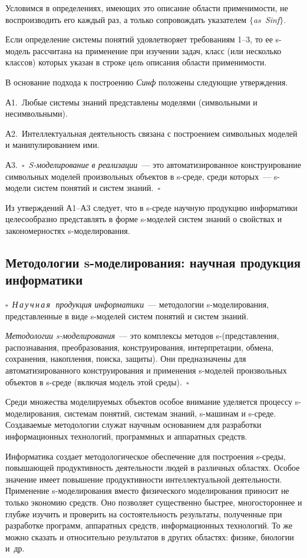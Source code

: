 \begin{multicols}{2}
Условимся в определениях, имеющих это описание области применимости, не 
воспроизводить его каждый раз, а только сопровождать указателем 
$\{$\textit{as~Sinf}$\}$.

Если определение системы понятий удовлетворяет требованиям 1--3, то ее s-модель 
рассчитана на применение при изучении задач, класс (или несколько классов) 
которых указан в строке \textit{цель} описания области применимости.

В основание подхода к построению \textit{Синф} положены следующие
утверждения.

А1.~Любые системы знаний представлены моделями (символьными и
несимвольными).

А2.~Интеллектуальная деятельность связана с построением символьных
моделей и манипулированием ими.

А3.~$\square$~\textit{S-моделирование в реализации}~--- это
автоматизированное конструирование символьных моделей произвольных
объектов в s-среде, среди которых~--- s-модели систем понятий и систем
знаний.~$\square$

Из утверждений А1--А3 следует, что в s-сре\-де научную продукцию информатики 
целесообразно представлять в форме s-мо\-де\-лей систем знаний о свойствах и 
закономерностях s-мо\-де\-ли\-ро\-ва\-ния. {

}
\subsection{Методологии s-моделирования: научная продукция
информатики } %

$\square$~\textit{Н\,а\,у\,ч\,н\,а\,я\,\ продукция информатики}~--- методологии 
s-моделирования, представленные в виде s-моделей систем понятий и систем 
знаний.

\textit{Методологии s-моделирования}~--- это комплексы методов
s-(представления, распознавания, преобразования, конструирования,
интерпретации, обмена, сохранения, накопления, поиска, защиты). Они
предназначены для автоматизированного конструирования и применения
s-моделей произвольных объектов в s-среде (включая модель этой
среды).~$\square$

Среди множества моделируемых объектов особое внимание уделяется процессу 
s-мо\-де\-лирования, системам понятий, системам знаний, s-ма\-ши\-нам и 
s-сре\-де. Создаваемые методологии служат научным основанием для разработки 
информационных технологий, программных и аппаратных средств.

Информатика создает методологическое обеспечение для построения s-сре\-ды, 
повышающей продуктивность деятельности людей в различных областях. Особое 
значение имеет повышение продуктивности интеллектуальной деятельности. 
Применение s-мо\-де\-ли\-ро\-ва\-ния вместо физического моделирования приносит 
не только экономию средств. Оно позволяет существенно быстрее, многостороннее и 
глубже изучить и проверить на состоятельность результаты, полученные при 
разработке программ, аппаратных средств, информационных технологий. То же можно 
сказать и относительно результатов в других областях: физике, биологии и~др. 


\end{multicols}
